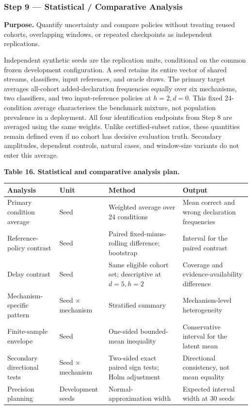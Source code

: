 \documentclass[
]{article}
\begin{document}
\hypertarget{step-9-statistical-comparative-analysis}{%
\subsubsection{Step 9 --- Statistical / Comparative
Analysis}\label{step-9-statistical-comparative-analysis}}

\textbf{Purpose.} Quantify uncertainty and compare policies without
treating reused cohorts, overlapping windows, or repeated checkpoints as
independent replications.

Independent synthetic seeds are the replication units, conditional on
the common frozen development configuration. A seed retains its entire
vector of shared streams, classifiers, input references, and oracle
draws. The primary target averages all-cohort added-declaration
frequencies equally over six mechanisms, two classifiers, and two
input-reference policies at \(h=2,d=0\). This fixed 24-condition average
characterises the benchmark mixture, not population prevalence in a
deployment. All four identification endpoints from Step 8 are averaged
using the same weights. Unlike certified-subset ratios, these quantities
remain defined even if no cohort has decisive evaluation truth.
Secondary amplitudes, dependent controls, natural cases, and window-size
variants do not enter this average.

\textbf{Table 16. Statistical and comparative analysis plan.}

\begin{longtable}[]{@{}
  >{\raggedright\arraybackslash}p{}
  >{\raggedright\arraybackslash}p{}
  >{\raggedright\arraybackslash}p{}
  >{\raggedright\arraybackslash}p{}@{}}
\toprule
Analysis & Unit & Method & Output \\
\midrule
\endhead
Primary condition average & Seed & Weighted average over 24 conditions &
Mean correct and wrong declaration frequencies \\
Reference-policy contrast & Seed & Paired fixed-minus-rolling
difference; bootstrap & Interval for the paired contrast \\
Delay contrast & Seed & Same eligible cohort set; descriptive at
\(d=5,h=2\) & Coverage and evidence-availability difference \\
Mechanism-specific pattern & Seed × mechanism & Stratified summary &
Mechanism-level heterogeneity \\
Finite-sample envelope & Seed & One-sided bounded-mean inequality &
Conservative interval for the latent mean \\
Secondary directional tests & Seed × mechanism & Two-sided exact paired
sign tests; Holm adjustment & Directional consistency, not mean
equality \\
Precision planning & Development seeds & Normal-approximation width &
Expected interval width at 30 seeds \\
\bottomrule
\end{longtable}
\end{document}
